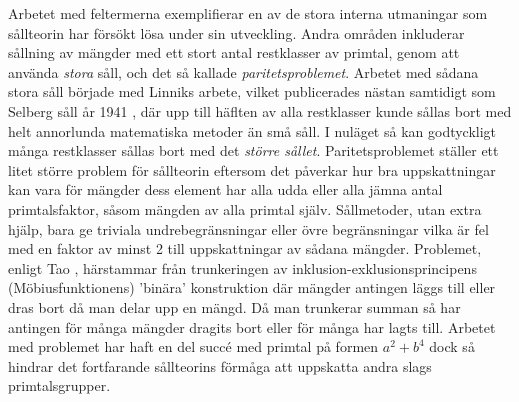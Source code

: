 Arbetet med feltermerna exemplifierar en av de stora interna utmaningar som sållteorin har försökt lösa under sin utveckling.
Andra områden inkluderar sållning av mängder med ett stort antal restklasser av primtal, genom att använda \textit{stora} såll, och det så kallade \textit{paritetsproblemet}. Arbetet med sådana stora såll började med Linniks arbete, vilket publicerades nästan samtidigt som Selberg såll år 1941 \cite[s. 135]{cojocarumurty}, där upp till häflten av alla restklasser kunde sållas bort med helt annorlunda matematiska metoder än små såll. 
I nuläget så kan godtyckligt många restklasser sållas bort med det \textit{större sållet}.
Paritetsproblemet ställer ett litet större problem för sållteorin eftersom det påverkar hur bra uppskattningar kan vara för mängder dess element har alla udda eller alla jämna antal primtalsfaktor, såsom mängden av alla primtal själv.
Sållmetoder, utan extra hjälp, bara ge triviala undrebegränsningar eller övre begränsningar vilka är fel med en faktor av minst 2 till uppskattningar av sådana mängder.
Problemet, enligt Tao \cite{Terry}, härstammar från trunkeringen av inklusion-exklusionsprincipens (Möbiusfunktionens)  'binära' konstruktion där mängder antingen läggs till eller dras bort då man delar upp en mängd. Då man trunkerar summan så har antingen för många mängder dragits bort eller för många har lagts till.
Arbetet med problemet har haft en del succé med primtal på formen \(a^2 + b^4\) \cite{abPrimes} dock så hindrar det fortfarande sållteorins förmåga att uppskatta andra slags primtalsgrupper.
